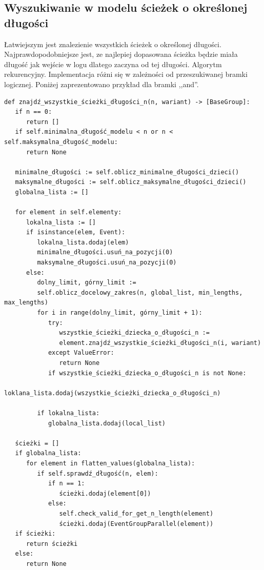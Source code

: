 \subsection{Wyszukiwanie w modelu ścieżek o określonej długości}

Łatwiejszym jest znalezienie wszystkich ścieżek o określonej długości. Najprawdopodobniejsze jest, ze najlepiej dopasowana ścieżka będzie miała długość jak wejście w logu dlatego zaczyna od tej długości. 
Algorytm rekurencyjny. Implementacja różni się w zależności od przeszukiwanej bramki logicznej. Poniżej zaprezentowano przykład dla bramki ,,and''.  
\lstset{caption=Wyszukiwanie procesów o długości n, captionpos=b}
\lstset{label=src:get_n_length, frame=single}
\begin{lstlisting}[escapeinside=``]
def znajdź_wszystkie_ścieżki_długości_n(n, wariant) -> [BaseGroup]:
   if n == 0:
      return []
   if self.minimalna_długość_modelu < n or n < self.maksymalna_długość_modelu:
      return None

   minimalne_długości := self.oblicz_minimalne_długości_dzieci()
   maksymalne_długości := self.oblicz_maksymalne_długości_dzieci()
   globalna_lista := []

   for element in self.elementy:
      lokalna_lista := []
      if isinstance(elem, Event):
         lokalna_lista.dodaj(elem)
         minimalne_długości.usuń_na_pozycji(0)
         maksymalne_długości.usuń_na_pozycji(0)
      else:
         dolny_limit, górny_limit := 
         self.oblicz_docelowy_zakres(n, global_list, min_lengths, max_lengths)
         for i in range(dolny_limit, górny_limit + 1):
            try:
               wszystkie_ścieżki_dziecka_o_długości_n := 
               element.znajdź_wszystkie_ścieżki_długości_n(i, wariant)
            except ValueError:
               return None
            if wszystkie_ścieżki_dziecka_o_długości_n is not None:
               loklana_lista.dodaj(wszystkie_ścieżki_dziecka_o_długości_n)

         if lokalna_lista:
            globalna_lista.dodaj(local_list)

   ścieżki = []
   if globalna_lista:
      for element in flatten_values(globalna_lista):
         if self.sprawdź_długość(n, elem):
            if n == 1:
               ścieżki.dodaj(element[0])
            else:
               self.check_valid_for_get_n_length(element)
               ścieżki.dodaj(EventGroupParallel(element))
   if ścieżki:
      return ścieżki
   else:
      return None
\end{lstlisting}

